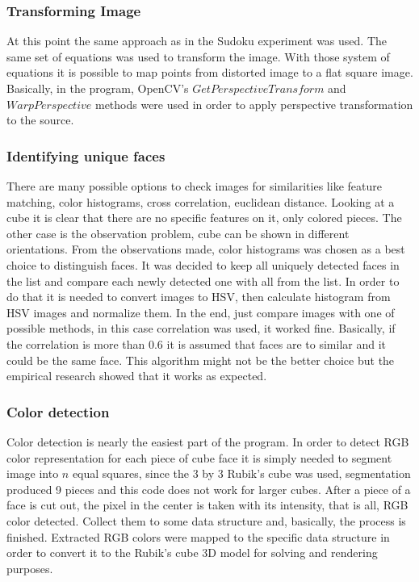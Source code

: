 \documentclass[../../main]{subfiles}
\begin{document}
\subsubsection{Transforming Image}

At this point the same approach as in the Sudoku experiment was used. The same set of equations was used to transform the image. With those system of equations it is possible to map points from distorted image to a flat square image. Basically, in the program, \ac{OpenCV}'s $GetPerspectiveTransform$ and $WarpPerspective$ methods were used in order to apply perspective transformation to the source.

\subsubsection{Identifying unique faces}

There are many possible options to check images for similarities like feature matching, color histograms, cross correlation, euclidean distance. Looking at a cube it is clear that there are no specific features on it, only colored pieces. The other case is the observation problem, cube can be shown in different orientations. From the observations made, color histograms was chosen as a best choice to distinguish faces.
It was decided to keep all uniquely detected faces in the list and compare each newly detected one with all from the list. In order to do that it is needed to convert images to \ac{HSV}, then calculate histogram from \ac{HSV} images and normalize them. In the end, just compare images with one of possible methods, in this case correlation was used, it worked fine. Basically, if the correlation is more than 0.6 it is assumed that faces are to similar and it could be the same face.
This algorithm might not be the better choice but the empirical research showed that it works as expected.

\subsubsection{Color detection}

Color detection is nearly the easiest part of the program. In order to detect \ac{RGB} color representation for each piece of cube face it is simply needed to segment image into $n$ equal squares, since the 3 by 3 Rubik's cube was used, segmentation produced 9 pieces and this code does not work for larger cubes.
After a piece of a face is cut out, the pixel in the center is taken with its intensity, that is all, \ac{RGB} color detected. Collect them to some data structure and, basically, the process is finished. Extracted \ac{RGB} colors were mapped to the specific data structure in order to convert it to the Rubik's cube 3D model for solving and rendering purposes. 
\end{document}
